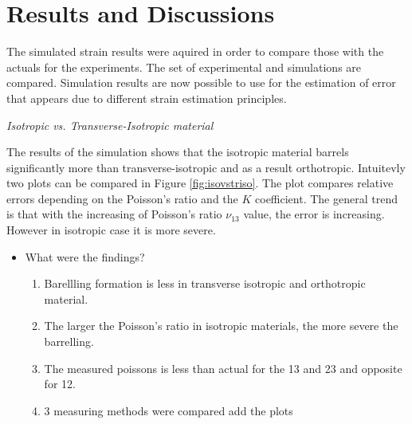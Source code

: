 \documentclass[review]{elsarticle}
\begin{document}
\section{Results and Discussions}
The simulated strain results were aquired in order to compare those with the
actuals for the experiments. The set of experimental and simulations are
compared. Simulation results are now possible to use for the estimation of error
that appears due to different strain estimation principles.

\begin{description}
\item{\textit{Isotropic vs. Transverse-Isotropic material}}
\end{description}
The results of the simulation shows that the isotropic material barrels
significantly more than transverse-isotropic and as a result orthotropic. 
Intuitevly two plots can be compared in Figure \ref{fig:isovstriso}. The plot
compares relative errors depending on the Poisson's ratio and the $K$
coefficient. The general trend is that with the increasing of Poisson's ratio
$\nu_{13}$ value, the error is increasing. However in isotropic case it is more
severe.



\begin{itemize}
\color{red}
\item What were the findings?

	\begin{enumerate}
	\color{black}
		\item Barellling formation is less in transverse isotropic and orthotropic
		material.
		\item The larger the Poisson's ratio in isotropic materials, the more severe
		the barrelling.
		\item The measured poissons is less than actual for the 13 and 23 and opposite
		for 12.
		\item 3 measuring methods were compared {\color{red} add the plots}
	\end{enumerate}
\end{itemize}


\color{black}
\end{document}
